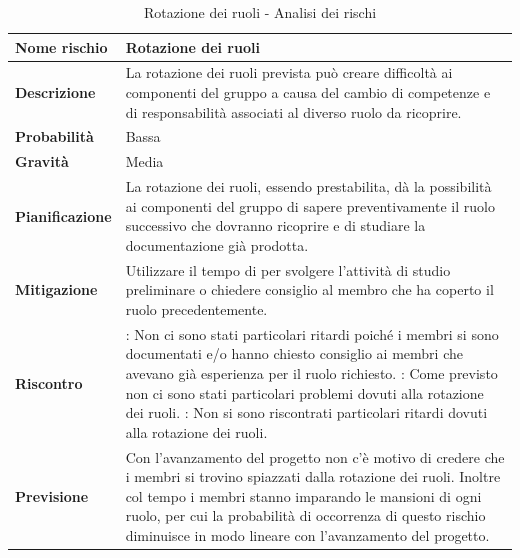 \documentclass[12pt,a4paper]{article}
\begin{document}
\begin{table}[H]
	\begin{center}
		\begin{tabular}{p{} p{}}
			\toprule
			\textbf{Nome rischio} & \textbf{Rotazione dei ruoli} \\
			\midrule
			\midrule
			\textbf{Descrizione} & La rotazione dei ruoli prevista può creare difficoltà ai 
                componenti del gruppo a causa del cambio di competenze e di responsabilità 
                associati al diverso ruolo da ricoprire. \\
			\midrule
			\textbf{Probabilità} & Bassa \\
			\midrule
			\textbf{Gravità} & Media \\
			\midrule
			\textbf{Pianificazione} &  La rotazione dei ruoli, essendo prestabilita, dà la possibilità ai componenti del gruppo di sapere preventivamente il ruolo successivo che dovranno ricoprire e di studiare la documentazione già prodotta. \\
			\midrule
			\textbf{Mitigazione} & Utilizzare il tempo di \mgls{slack} per svolgere l'attività di studio preliminare o chiedere consiglio al membro che ha coperto il ruolo precedentemente. \\
            \midrule
            \textbf{Riscontro} & 
                \textbf{\FA{}}: Non ci sono stati particolari ritardi poiché i membri si sono documentati 
                    e/o hanno chiesto consiglio ai membri che avevano già esperienza per il ruolo richiesto. \newline
                \textbf{\FAD{}}: Come previsto non ci sono stati particolari problemi dovuti alla rotazione
                    dei ruoli. \newline
                \textbf{\FPA{}}: Non si sono riscontrati particolari ritardi dovuti alla rotazione dei ruoli. \\
            \midrule
            \textbf{Previsione} & Con l'avanzamento del progetto non c'è motivo di credere che i membri si trovino spiazzati dalla rotazione dei ruoli. Inoltre col tempo i membri stanno imparando le mansioni di ogni ruolo, per cui la probabilità di occorrenza di questo rischio diminuisce in modo lineare con l'avanzamento del progetto. \\
			\bottomrule
		\end{tabular}
		\caption{Rotazione dei ruoli - Analisi dei rischi}
	\end{center}
\end{table}
\end{document}
